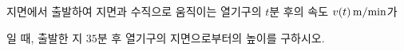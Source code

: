 지면에서 출발하여 지면과 수직으로 움직이는 열기구의 $t$분 후의 속도 $v(t)\mkern3mu \mathrm{m/min}$가 \par\smallskip{}\par\smallskip\noindent 일 때, 출발한 지 $35$분 후 열기구의 지면으로부터의 높이를 구하시오.
